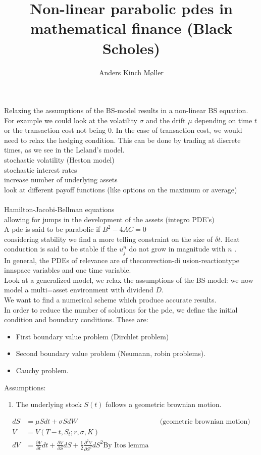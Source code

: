 \documentclass[danish,a4paper,11pt]{article}
\title{Non-linear parabolic pdes in mathematical finance (Black Scholes)}
\author{Anders Kinch Møller}
\date{}
\begin{document}
\maketitle
  Relaxing the assumptions of the BS-model results in a non-linear BS equation. \\
  For example we could look at the volatility \( \sigma \) and the drift \( \mu  \) depending on time \( t \) or the transaction cost not being \( 0 \). In the case of transaction cost, we would need to relax the hedging condition. This can be done by trading at discrete times, as we see in the Leland's model.\\

  stochastic volatility (Heston model)\\
  stochastic interest rates \\
  increase number of underlying assets\\
  look at different payoff functions (like options on the maximum or average)\\
  \\
  Hamilton-Jacobi-Bellman equations \\
  allowing for jumps in the development of the assets (integro PDE's) \\

  A pde is said to be parabolic if \( B^{2} -4AC = 0 \) \\
  considering stability we find a more telling constraint on the size of \( \delta t  \). Heat conduction is said to be stable if the \( u_{j}^{n}  \) do not grow in magnitude with \( n \) . \\
In general, the PDEs of relevance are of theconvection-di usion-reactiontype innspace variables and one time variable.\\
Look at a generalized model, we relax the assumptions of the BS-model: we now model a multi=asset environment with dividend \( D \). \\
We want to find a numerical scheme which produce accurate results. \\
In order to reduce the number of solutions for the pde, we define the initial condition and boundary conditions. These are:
\begin{itemize}
  \item First boundary value problem (Dirchlet problem)
  \item Second boundary value problem (Neumann, robin problems).
  \item Cauchy problem.

\end{itemize}

Assumptions:
\begin{enumerate}
  \item The underlying stock \( S(t) \) follows a geometric brownian motion.
\end{enumerate}
\begin{align*}
  dS  &= \mu S dt  + \sigma S dW && \text{(geometric brownian motion)}  \\
  V & = V(T-t,S_t;r, \sigma, K) \\
  dV    & = \frac{\partial V}{\partial t} dt  + \frac{\partial V}{\partial S} dS  + \frac{1}{2} \frac{\partial^{2} V}{\partial S^{2}} dS^{2} \text{By Itos lemma}
\end{align*}
\end{document}
